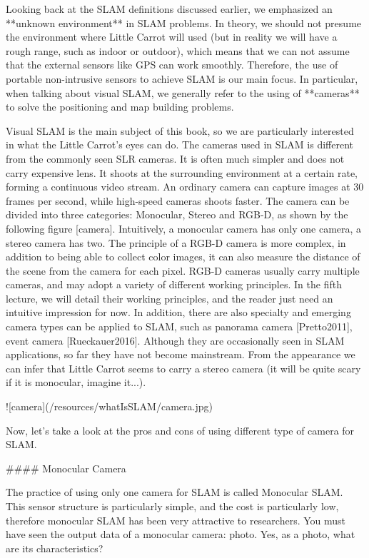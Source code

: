Looking back at the SLAM definitions discussed earlier, we emphasized an **unknown environment** in SLAM problems. In theory, we should not presume the environment where Little Carrot will used (but in reality we will have a rough range, such as indoor or outdoor), which means that we can not assume that the external sensors like GPS can work smoothly. Therefore, the use of portable non-intrusive sensors to achieve SLAM is our main focus. In particular, when talking about visual SLAM, we generally refer to the using of **cameras** to solve the positioning and map building problems.

Visual SLAM is the main subject of this book, so we are particularly interested in what the Little Carrot's eyes can do. The cameras used in SLAM is different from the commonly seen SLR cameras. It is often much simpler and does not carry expensive lens. It shoots at the surrounding environment at a certain rate, forming a continuous video stream. An ordinary camera can capture images at 30 frames per second, while high-speed cameras shoots faster. The camera can be divided into three categories: Monocular, Stereo and RGB-D, as shown by the following figure [camera]. Intuitively, a monocular camera has only one camera, a stereo camera has two. The principle of a RGB-D camera is more complex, in addition to being able to collect color images, it can also measure the distance of the scene from the camera for each pixel. RGB-D cameras usually carry multiple cameras, and may adopt a variety of different working principles. In the fifth lecture, we will detail their working principles, and the reader just need an intuitive impression for now. In addition, there are also specialty and emerging camera types can be applied to SLAM, such as panorama camera [Pretto2011], event camera [Rueckauer2016]. Although they are occasionally seen in SLAM applications, so far they have not become mainstream. From the appearance we can infer that Little Carrot seems to carry a stereo camera (it will be quite scary if it is monocular, imagine it...).

![camera](/resources/whatIsSLAM/camera.jpg)

Now, let's take a look at the pros and cons of using different type of camera for SLAM.

#### Monocular Camera

The practice of using only one camera for SLAM is called Monocular SLAM. This sensor structure is particularly simple, and the cost is particularly low, therefore monocular SLAM has been very attractive to researchers. You must have seen the output data of a monocular camera: photo. Yes, as a photo, what are its characteristics?


